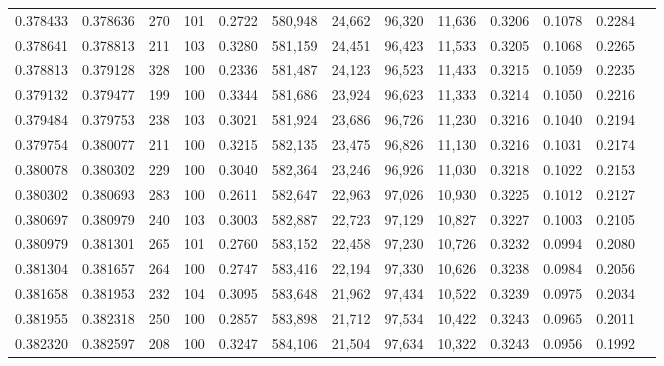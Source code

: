 \begin{tabular}{rrrrrrrrrrrrr}
0.378433 & 0.378636 &   270 & 101 &                                     0.2722 & 580,948 &  24,662 &  96,320 &  11,636 & 0.3206 & 0.1078 & 0.2284 \\
0.378641 & 0.378813 &   211 & 103 &                                     0.3280 & 581,159 &  24,451 &  96,423 &  11,533 & 0.3205 & 0.1068 & 0.2265 \\
0.378813 & 0.379128 &   328 & 100 &                                     0.2336 & 581,487 &  24,123 &  96,523 &  11,433 & 0.3215 & 0.1059 & 0.2235 \\
0.379132 & 0.379477 &   199 & 100 &                                     0.3344 & 581,686 &  23,924 &  96,623 &  11,333 & 0.3214 & 0.1050 & 0.2216 \\
0.379484 & 0.379753 &   238 & 103 &                                     0.3021 & 581,924 &  23,686 &  96,726 &  11,230 & 0.3216 & 0.1040 & 0.2194 \\
0.379754 & 0.380077 &   211 & 100 &                                     0.3215 & 582,135 &  23,475 &  96,826 &  11,130 & 0.3216 & 0.1031 & 0.2174 \\
0.380078 & 0.380302 &   229 & 100 &                                     0.3040 & 582,364 &  23,246 &  96,926 &  11,030 & 0.3218 & 0.1022 & 0.2153 \\
0.380302 & 0.380693 &   283 & 100 &                                     0.2611 & 582,647 &  22,963 &  97,026 &  10,930 & 0.3225 & 0.1012 & 0.2127 \\
0.380697 & 0.380979 &   240 & 103 &                                     0.3003 & 582,887 &  22,723 &  97,129 &  10,827 & 0.3227 & 0.1003 & 0.2105 \\
0.380979 & 0.381301 &   265 & 101 &                                     0.2760 & 583,152 &  22,458 &  97,230 &  10,726 & 0.3232 & 0.0994 & 0.2080 \\
0.381304 & 0.381657 &   264 & 100 &                                     0.2747 & 583,416 &  22,194 &  97,330 &  10,626 & 0.3238 & 0.0984 & 0.2056 \\
0.381658 & 0.381953 &   232 & 104 &                                     0.3095 & 583,648 &  21,962 &  97,434 &  10,522 & 0.3239 & 0.0975 & 0.2034 \\
0.381955 & 0.382318 &   250 & 100 &                                     0.2857 & 583,898 &  21,712 &  97,534 &  10,422 & 0.3243 & 0.0965 & 0.2011 \\
0.382320 & 0.382597 &   208 & 100 &                                     0.3247 & 584,106 &  21,504 &  97,634 &  10,322 & 0.3243 & 0.0956 & 0.1992 \\

\end{tabular}
